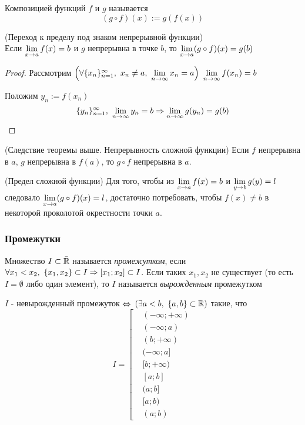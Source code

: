 \begin{definition}
	Композицией функций $f$ и $g$ называется 
	$$
		(g \circ f)(x) := g(f(x))
	$$
\end{definition}

\begin{theorem} (Переход к пределу под знаком непрерывной функции) \\
	Если $\lim\limits_{x \to a} f(x) = b$ и $g$ непрерывна в точке $b$, то $\lim\limits_{x \to a} (g \circ f)(x) = g(b)$
\end{theorem}

\begin{proof}
	Рассмотрим $\left(\forall \{x_n\}_{n = 1}^\infty,\ x_n \neq a,\ \lim\limits_{n \to \infty} x_n = a\right)\ \lim\limits_{n \to \infty} f(x_n) = b$
	
	Положим $y_n := f(x_n)$
	$$
		\{y_n\}_{n = 1}^\infty,\ \lim\limits_{n \to \infty} y_n = b \Rightarrow \lim\limits_{n \to \infty} g(y_n) = g(b) 
	$$
\end{proof}

\begin{addition} (Следствие теоремы выше. Непрерывность сложной функции)
	Если $f$ непрерывна в $a$, $g$ непрерывна в $f(a)$, то $g \circ f$ непрерывна в $a$.
\end{addition}

\begin{note} (Предел сложной функции)
	Для того, чтобы из $\lim\limits_{x \to a} f(x) = b$ и $\lim\limits_{y \to b} g(y) = l$ следовало $\lim\limits_{x \to a} (g \circ f)(x) = l$, достаточно потребовать, чтобы $f(x) \neq b$ в некоторой проколотой окрестности точки $a$.
\end{note}

\subsubsection*{Промежутки}

\begin{definition}
	Множество $I \subset \bar{\mathbb{R}}$ называется \textit{промежутком}, если $\forall x_1 < x_2,\ \{x_1, x_2\} \subset I \Rightarrow [x_1; x_2] \subset I$. Если таких $x_1, x_2$ не существует (то есть $I = \emptyset$ либо один элемент), то $I$ называется \textit{вырожденным} промежутком
\end{definition}

\begin{lemma}
	$I$ - невырожденный промежуток $\Leftrightarrow$ $\left(\exists a < b,\ \{a, b\} \subset \mathbb{R}\right)$ такие, что
	\[
		I = \left[
		\begin{aligned}
			&(-\infty; +\infty)
			\\
			&(-\infty; a)
			\\
			&(b; +\infty)
			\\
			&(-\infty; a]
			\\
			&[b; +\infty)
			\\
			&[a; b]
			\\
			&(a; b]
			\\
			&[a; b)
			\\
			&(a; b)
		\end{aligned}
		\right.
	\]
\end{lemma}

